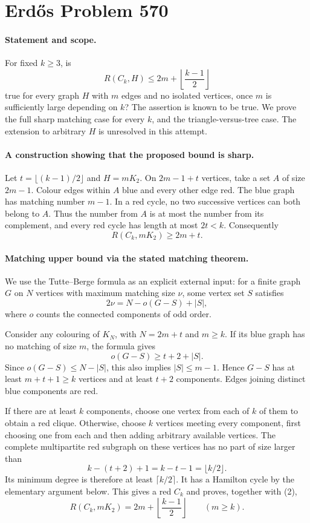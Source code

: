 \section*{Erd\H{o}s Problem 570}

\paragraph{Statement and scope.}
For fixed \(k\geq3\), is
\[
 R(C_k,H)\leq2m+\left\lfloor\frac{k-1}{2}\right\rfloor
 \tag{1}
\]
true for every graph \(H\) with \(m\) edges and no isolated vertices,
once \(m\) is sufficiently large depending on \(k\)?
The assertion is known to be true. We prove the full sharp matching
case for every \(k\), and the triangle-versus-tree case. The extension
to arbitrary \(H\) is unresolved in this attempt.

\paragraph{A construction showing that the proposed bound is sharp.}
Let \(t=\lfloor(k-1)/2\rfloor\) and \(H=mK_2\).
On \(2m-1+t\) vertices, take a set \(A\) of size \(2m-1\).
Colour edges within \(A\) blue and every other edge red.
The blue graph has matching number \(m-1\).
In a red cycle, no two successive vertices can both belong to
\(A\). Thus the number from \(A\) is at most the number from its
complement, and every red cycle has length at most \(2t<k\).
Consequently
\[
 R(C_k,mK_2)\geq2m+t. \tag{2}
\]

\paragraph{Matching upper bound via the stated matching theorem.}
We use the Tutte--Berge formula as an explicit external input:
for a finite graph \(G\) on \(N\) vertices with maximum matching
size \(\nu\), some vertex set \(S\) satisfies
\[
 2\nu=N-o(G-S)+|S|,
\]
where \(o\) counts the connected components of odd order.

Consider any colouring of \(K_N\), with \(N=2m+t\) and \(m\geq k\).
If its blue graph has no matching of size \(m\), the formula gives
\[
 o(G-S)\geq t+2+|S|.
\]
Since \(o(G-S)\leq N-|S|\), this also implies \(|S|\leq m-1\).
Hence \(G-S\) has at least \(m+t+1\geq k\) vertices and at least
\(t+2\) components. Edges joining distinct blue components are red.

If there are at least \(k\) components, choose one vertex from
each of \(k\) of them to obtain a red clique. Otherwise, choose
\(k\) vertices meeting every component, first choosing one from
each and then adding arbitrary available vertices.
The complete multipartite red subgraph on these vertices has no
part of size larger than
\[
 k-(t+2)+1=k-t-1=\lfloor k/2\rfloor.
\]
Its minimum degree is therefore at least \(\lceil k/2\rceil\).
It has a Hamilton cycle by the elementary argument below.
This gives a red \(C_k\) and proves, together with (2),
\[
 R(C_k,mK_2)=2m+\left\lfloor\frac{k-1}{2}\right\rfloor
 \qquad(m\geq k). \tag{3}
\]


